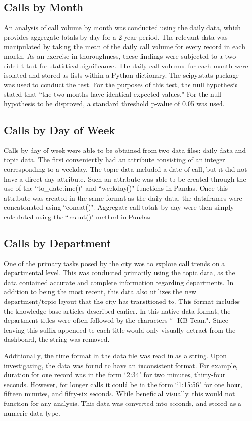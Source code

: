 \documentclass{article}
\begin{document}
	\subsection{Calls by Month}

An analysis of call volume by month was conducted using the daily data, which provides aggregate totals by day for a 2-year period. The relevant data was manipulated by taking the mean of the daily call volume for every record in each month.  As an exercise in thoroughness, these findings were subjected to a two-sided t-test for statistical significance.  The daily call volumes for each month were isolated and stored as lists within a Python dictionary.  The scipy.stats package was used to conduct the test.  For the purposes of this test, the null hypothesis stated that ``the two months have identical expected values."  For the null hypothesis to be disproved, a standard threshold p-value of 0.05 was used.

	\subsection{Calls by Day of Week}

Calls by day of week were able to be obtained from two data files:  daily data and topic data.  The first conveniently had an attribute consisting of an integer corresponding to a weekday.  The topic data included a date of call, but it did not have a direct day attribute.  Such an attribute was able to be created through the use of the ``to\_datetime()" and ``weekday()" functions in Pandas.  Once this attribute was created in the same format as the daily data, the dataframes were concatonated using ``concat()".  Aggregate call totals by day were then simply calculated using the ``.count()" method in Pandas.

	\subsection{Calls by Department}

One of the primary tasks posed by the city was to explore call trends on a departmental level.  This was conducted primarily using the topic data, as the data contained accurate and complete information regarding departments.  In addition to being the most recent, this data also utilizes the new department/topic layout that the city has transitioned to.  This format includes the knowledge base articles described earlier.  In this native data format, the department titles were often followed by the characters ``- KB Team".  Since leaving this suffix appended to each title would only visually detract from the dashboard, the string was removed.  
\par
Additionally, the time format in the data file was read in as a string.  Upon investigating, the data was found to have an inconsistent format.  For example, duration for one record was in the form ``2:34" for two minutes, thirty-four seconds.  However, for longer calls it could be in the form ``1:15:56" for one hour, fifteen minutes, and fifty-six seconds.  While beneficial visually, this would not function for any analysis.  This data was converted into seconds, and stored as a numeric data type.
\end{document}
